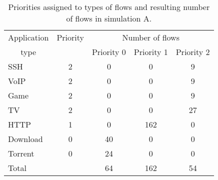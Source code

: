 \begin{table}
	\centering
	\begin{tabular}{@{}l|cccc@{}}
		\toprule
		\multicolumn{1}{c|}{Application} & Priority & \multicolumn{3}{c}{Number of flows}  \\
		\multicolumn{1}{c|}{type}        &          & Priority 0 & Priority 1 & Priority 2 \\ \midrule
		SSH                              &    2     &     0      &     0      &     9      \\
		VoIP                             &    2     &     0      &     0      &     9      \\
		Game                             &    2     &     0      &     0      &     9      \\
		TV                               &    2     &     0      &     0      &     27     \\
		HTTP                             &    1     &     0      &    162     &     0      \\
		Download                         &    0     &     40     &     0      &     0      \\
		Torrent                          &    0     &     24     &     0      &     0      \\ \midrule
		Total                            &          &     64     &    162     &     54     \\ \bottomrule
	\end{tabular}

	\caption{Priorities assigned to types of flows and resulting number of flows in simulation A.}
	\label{tab:flows_count_A}
\end{table}